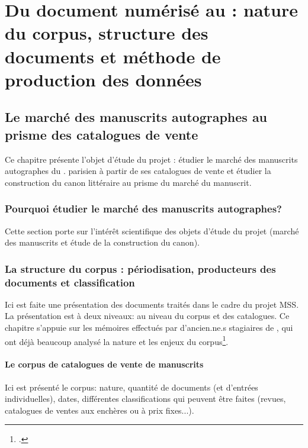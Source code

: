 
\part{Du document numérisé au \xmltei: nature du corpus, structure des documents et méthode de production des données}
\chapter{Le marché des manuscrits autographes au prisme des catalogues de vente}
Ce chapitre présente l'objet d'étude du projet \mss{} : étudier le marché des manuscrits autographes du . parisien à partir de ses catalogues de vente et étudier la construction du canon littéraire au prisme du marché du manuscrit.

\section{Pourquoi étudier le marché des manuscrits autographes?}
Cette section porte sur l'intérêt scientifique des objets d'étude du projet (marché des manuscrits et étude de la construction du canon).


\section{La structure du corpus : périodisation, producteurs des documents et classification}
Ici est faite une présentation des documents traités dans le cadre du projet MSS. La présentation est à deux niveaux: au niveau du corpus et des catalogues. Ce chapitre s'appuie sur les mémoires effectués par d'ancien.ne.s stagiaires de \ktb{}, qui ont déjà beaucoup analysé la nature et les enjeux du corpus\footcite{rondeau_du_noyer_encoder_2019, corbieres_du_2020, janes_du_2021}.

\subsection{Le corpus de catalogues de vente de manuscrits}
Ici est présenté le corpus: nature, quantité de documents (et d'entrées individuelles), dates, différentes classifications qui peuvent être faites (revues, catalogues de ventes aux enchères ou à prix fixes...).

